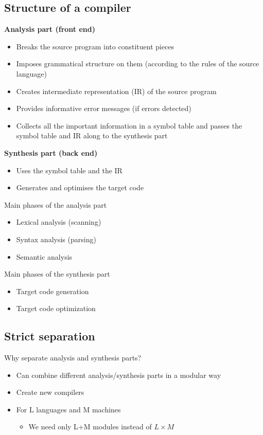 \documentclass{article}[18pt]
\begin{document}
\subsection{Structure of a compiler}
\textbf{Analysis part (front end)}
\begin{itemize}
	\item Breaks the source program into constituent pieces
	\item Imposes grammatical structure on them (according to the rules of the source language)
	\item Creates intermediate representation (IR) of the source program
	\item Provides informative error messages (if errors detected)
	\item Collects all the important information in a symbol table and passes the symbol table and IR along to the synthesis part
\end{itemize}
\textbf{Synthesis part (back end)}
\begin{itemize}
	\item Uses the symbol table and the IR
	\item Generates and optimises the target code
\end{itemize}
Main phases of the analysis part
\begin{itemize}
	\item Lexical analysis (scanning)
	\item Syntax analysis (parsing)
	\item Semantic analysis
\end{itemize}
Main phases of the synthesis part
\begin{itemize}
	\item Target code generation
	\item Target code optimization
\end{itemize}
\subsection{Strict separation}
Why separate analysis and synthesis parts?
\begin{itemize}
	\item Can combine different analysis/synthesis parts in a modular way
	\item Create new compilers
	\item For L languages and M machines
	\begin{itemize}
		\item We need only L+M modules instead of $L\times M$
	\end{itemize}
\end{itemize}
\end{document}
